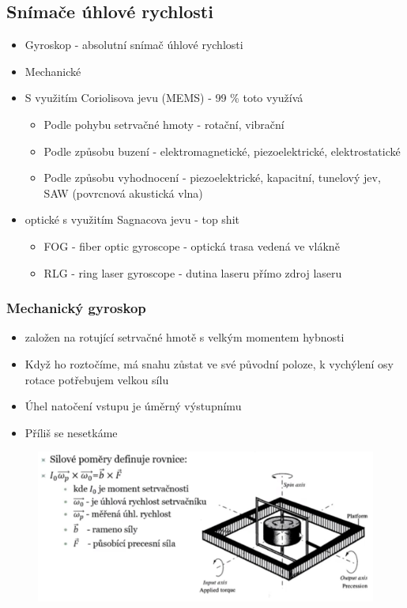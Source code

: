 \subsection*{Snímače úhlové rychlosti}
\begin{itemize}
    \item Gyroskop - absolutní snímač úhlové rychlosti
    \item Mechanické
    \item S využitím Coriolisova jevu (MEMS) - 99 \% toto využívá \begin{itemize}
              \item Podle pohybu setrvačné hmoty - rotační, vibrační
              \item Podle způsobu buzení - elektromagnetické, piezoelektrické, elektrostatické
              \item Podle způsobu vyhodnocení - piezoelektrické, kapacitní, tunelový jev, SAW (povrcnová akustická vlna)
          \end{itemize}
    \item optické s využitím Sagnacova jevu - top shit \begin{itemize}
              \item FOG - fiber optic gyroscope - optická trasa vedená ve vlákně
              \item RLG - ring laser gyroscope - dutina laseru přímo zdroj laseru
          \end{itemize}
\end{itemize}

\subsubsection*{Mechanický gyroskop}
\begin{itemize}
    \item založen na rotující setrvačné hmotě s velkým momentem hybnosti
    \item Když ho roztočíme, má snahu zůstat ve své původní poloze, k vychýlení osy rotace potřebujem velkou sílu
    \item Úhel natočení vstupu je úměrný výstupnímu
    \item Příliš se nesetkáme
\end{itemize}

\begin{figure}[h]
    \centering
    \includegraphics[scale = 0.50]{img/TyPicoMeTakBaviVypracovavatSnimace.png}
\end{figure}

